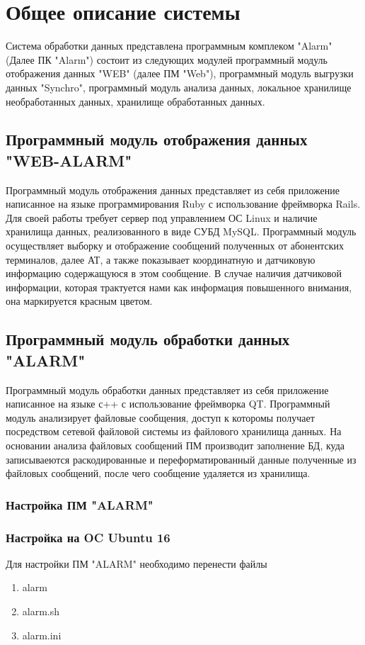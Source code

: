 \documentclass[12pt]{article}[a4paper,14pt,russian]
\begin{document}
	\section{Общее описание системы}
	Система обработки данных представлена программным комплеком "Alarm" (Далее ПК "Alarm") состоит из следующих модулей
	программный модуль отображения данных "WEB" (далее ПМ "Web"), программный модуль выгрузки данных "Synchro",
	программный модуль анализа данных, локальное хранилище необработанных данных, хранилище обработанных данных.
	
	\subsection{Программный модуль отображения данных "WEB-ALARM"}
	Программный модуль отображения данных представляет из себя приложение написанное
	на языке программирования Ruby с использование фреймворка Rails. Для своей работы требует сервер под управлением ОС Linux и наличие хранилища данных, реализованного в виде СУБД MySQL. Программный модуль осуществляет выборку и отображение сообщений полученных от абонентских терминалов, далее АТ, а также показывает координатную и датчиковую информацию содержащуюся в этом сообщение. В случае наличия датчиковой информации, которая трактуется нами как информация повышенного внимания, она маркируется красным цветом.
	
	\subsection{Программный модуль обработки данных "ALARM"}
	Программный модуль обработки данных представляет из себя приложение написанное на
	языке с++ с использование фреймворка QT. Программный модуль анализирует файловые сообщения, доступ к которомы получает посредством сетевой файловой системы из файлового хранилища данных. На основании анализа файловых сообщений ПМ производит заполнение БД, куда записываеются раскодированные и переформатированный данные полученные из файловых сообщений, после чего сообщение удаляется из хранилища. 
	\subsubsection{Настройка ПМ "ALARM"}
	\subsubsection{Настройка на OC Ubuntu 16}
	Для настройки ПМ "ALARM" необходимо перенести файлы
	\begin{enumerate}
	\item alarm
	\item alarm.sh
	\item alarm.ini
	\end{enumerate}
	
\end{document}
